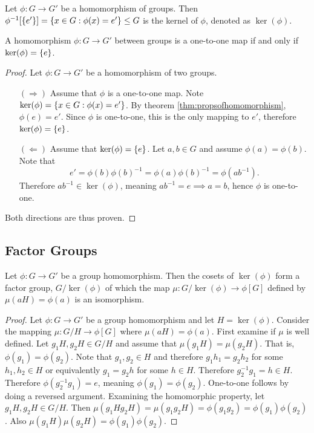\documentclass[../notes.tex]{subfiles}
\begin{document}
\begin{definition}
	Let $\phi : G \to G'$ be a homomorphism of groups. Then $\phi^{-1}[\qty{e'}] = \qty{x \in G : \phi(x) = e'} \leq G$ is the kernel of $\phi$, denoted as $\ker(\phi)$.
\end{definition}

\begin{theorem}
	A homomorphism $\phi : G \to G'$ between groups is a one-to-one map if and only if $\ker(\phi) = \qty{e}$.
\end{theorem}

\begin{proof}
	Let $\phi : G \to G'$ be a homomorphism of two groups.
	\begin{enumerate}
		\item[$(\Rightarrow)$]
			Assume that $\phi$ is a one-to-one map. Note $\ker(\phi) = \qty{x \in G : \phi(x) = e'}$. By theorem \ref{thm:propsofhomomorphism}, $\phi(e) = e'$. Since $\phi$ is one-to-one, this is the only mapping to $e'$, therefore $\ker(\phi) = \qty{e}$.
		\item[$(\Leftarrow)$]
			Assume that $\ker(\phi) = \qty{e}$. Let $a,b \in G$ and assume $\phi(a) = \phi(b)$. Note that
			\[
				e' = \phi(b)\phi(b)^{-1} = \phi(a) \phi(b)^{-1} = \phi(ab^{-1})
			.\]
			Therefore $ab^{-1} \in \ker(\phi)$, meaning $ab^{-1} = e \implies a = b$, hence $\phi$ is one-to-one.
	\end{enumerate}
	Both directions are thus proven.
\end{proof}

\subsection*{Factor Groups}

\begin{theorem}
	Let $\phi : G \to G'$ be a group homomorphism. Then the cosets of $\ker(\phi)$ form a factor group, $G \slash \ker(\phi)$ of which the map $\mu : G \slash \ker(\phi) \to \phi[G]$ defined by $\mu(aH) = \phi(a)$ is an isomorphism.
\end{theorem}

\begin{proof}
	Let $\phi : G \to G'$ be a group homomorphism and let $H = \ker(\phi)$. Consider the mapping $\mu : G \slash H \to \phi[G]$ where $\mu(aH) = \phi(a)$. First examine if $\mu$ is well defined. Let $g_1 H, g_2 H \in G \slash H$ and assume that $\mu(g_1 H) = \mu(g_2 H)$. That is, $\phi(g_1) = \phi(g_2)$. Note that $g_1, g_2 \in H$ and therefore $g_1 h_1 = g_2 h_2$ for some $h_1, h_2 \in H$ or equivalently $g_1 = g_2 h$ for some $h \in H$. Therefore $g_2^{-1} g_1 = h \in H$. Therefore $\phi(g_2^{-1} g_1) = e$, meaning $\phi(g_1) = \phi(g_2)$. One-to-one follows by doing a reversed argument. Examining the homomorphic property, let $g_1 H, g_2 H \in G \slash H$. Then $\mu(g_1 H g_2 H) = \mu(g_1 g_2 H) = \phi(g_1 g_2) = \phi(g_1) \phi(g_2)$. Also $\mu(g_1 H) \mu(g_2 H) = \phi(g_1) \phi(g_2)$.
\end{proof}
\end{document}
